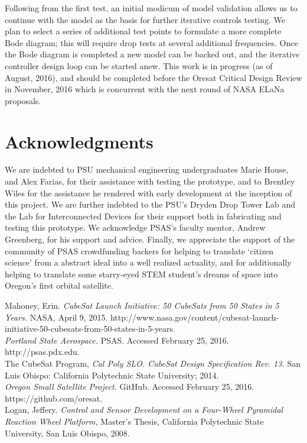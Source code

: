 \documentclass[]{aiaa-tc}%
\begin{document}
Following from the first test, an initial modicum of model validation allows us to continue with the model as the basis for further iterative controls testing. We plan to select a series of additional test points to formulate a more complete Bode diagram; this will require drop tests at several additional frequencies. Once the Bode diagram is completed a new model can be backed out, and the iterative controller design loop can be started anew. This work is in progress (as of August, 2016), and should be completed before the Oresat Critical Design Review in November, 2016 which is concurrent with the next round of NASA ELaNa proposals.

\section{Acknowledgments}
We are indebted to PSU mechanical engineering undergraduates Marie House, and Alex Farias, for their assistance with testing the prototype, and to Brentley Wiles for the assistance he rendered with early development at the inception of this project. We are further indebted to the PSU's Dryden Drop Tower Lab and the Lab for Interconnected Devices for their support both in fabricating and testing this prototype. We acknowledge PSAS's faculty mentor, Andrew Greenberg, for his support and advice. Finally, we appreciate the support of the community of PSAS crowdfunding backers for helping to translate `citizen science' from a abstract ideal into a well realized actuality, and for additionally helping to translate some starry-eyed STEM student's dreams of space into Oregon's first orbital satellite.

\begin{thebibliography}{9}%

Mahoney, Erin. {\it CubeSat Launch Initiative: 50 CubeSats from 50 States in 5 Years.} NASA, April 9, 2015. http://www.nasa.gov/content/cubesat-launch-initiative-50-cubesats-from-50-states-in-5-years.\\

{\it Portland State Aerospace.} PSAS. Accessed February 25, 2016. http://psas.pdx.edu.\\

The CubeSat Program, {\it Cal Poly SLO. CubeSat Design Specification Rev. 13.} San Luis
Obispo: California Polytechnic State University; 2014.\\

{\it Oregon Small Satellite Project.} GitHub. Accessed February 25, 2016. https://github.com/oresat.\\

Logan, Jeffery. {\it Control and Sensor Development on a Four-Wheel Pyramidal Reaction Wheel Platform,} Master’s Thesis, California Polytechnic State University, San Luis Obispo, 2008.\\


\end{thebibliography}
\end{document}
